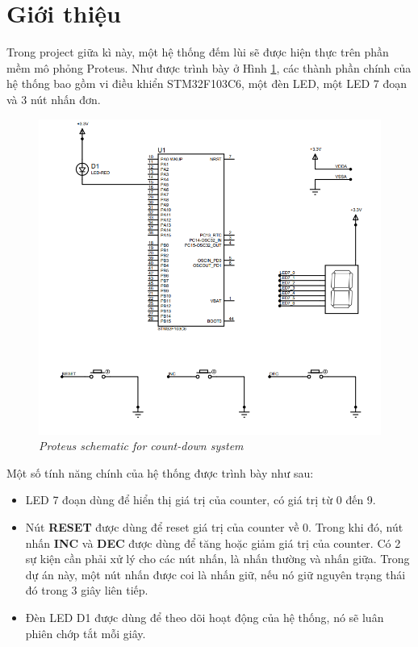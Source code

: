 
\section{Giới thiệu}
Trong project giữa kì này, một hệ thống đếm lùi sẽ được hiện thực trên phần mềm mô phỏng Proteus. Như được trình bày ở Hình \ref{project_intro1}, các thành phần chính của hệ  thống bao gồm vi điều khiển STM32F103C6, một đèn LED, một LED 7 đoạn và 3 nút nhấn đơn.

\begin{figure}[!htp]
    \centering
    \includegraphics[width=5in]{source/picture/midterm/midtermschematic.PNG}
    \caption{\textit{Proteus schematic for count-down system}}
    \label{project_intro1}
\end{figure}

Một số tính năng chính của hệ thống được trình bày như sau:
\begin{itemize}
    \item LED 7 đoạn dùng để hiển thị giá trị của counter, có giá trị từ 0 đến 9.
    \item Nút \textbf{RESET} được dùng để reset giá trị của counter về 0. Trong khi đó, nút nhấn \textbf{INC} và \textbf{DEC} được dùng để tăng hoặc giảm giá trị của counter. Có 2 sự kiện cần phải xử lý cho các nút nhấn, là nhấn thường và nhấn giữa. Trong dự án này, một nút nhấn được coi là nhấn giữ, nếu nó giữ nguyên trạng thái đó trong 3 giây liên tiếp.
    \item Đèn LED D1 được dùng để theo dõi hoạt động của hệ thống, nó sẽ luân phiên chớp tắt mỗi giây.
\end{itemize}

